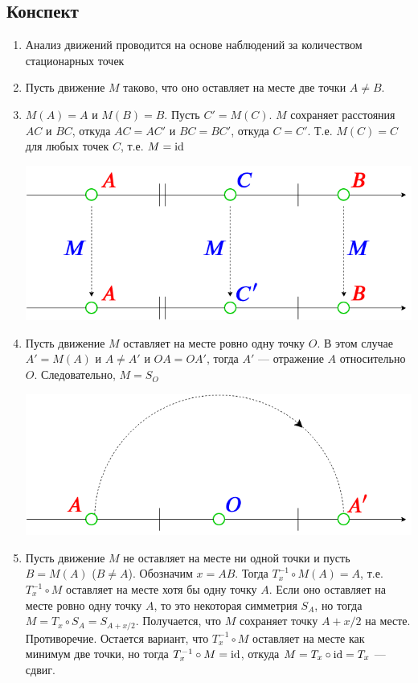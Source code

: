\subsection{Конспект}
\begin{enumerate}
\item Анализ движений проводится на основе наблюдений за количеством стационарных точек
\item Пусть движение $M$ таково, что оно оставляет на месте две точки $A\ne B$.
\item $M(A)=A$ и $M(B)=B$. Пусть $C'=M(C)$. $M$ сохраняет расстояния $AC$ и $BC$, откуда $AC=AC'$ и $BC=BC'$, откуда $C=C'$. Т.е. $M(C)=C$ для любых точек $C$, т.е. $M=\mathrm{id}$

\begin{center}
\includegraphics[scale=0.35]{LineMoving.png}
\end{center}
\item Пусть движение $M$ оставляет на месте ровно одну точку $O$. В этом случае $A'=M(A)$ и $A\ne A'$ и $OA=OA'$, тогда $A'$ --- отражение $A$ относительно $O$. Следовательно, $M=S_O$
\begin{center}
\includegraphics[scale=0.35]{LineMovingO.png}
\end{center}
\item Пусть движение $M$ не оставляет на месте ни одной точки и пусть $B=M(A)$ ($B\ne A$). Обозначим $x=AB$. Тогда $T_{x}^{-1}\circ M(A)=A$, т.е. $T_{x}^{-1}\circ M$ оставляет на месте хотя бы одну точку $A$. Если оно оставляет на месте ровно одну точку $A$, то это некоторая симметрия $S_A$, но тогда $M=T_x\circ S_A=S_{A+x/2}$. Получается, что $M$ сохраняет точку $A+x/2$ на месте. Противоречие. Остается вариант, что $T_{x}^{-1}\circ M$ оставляет на месте как минимум две точки, но тогда $T_{x}^{-1}\circ M=\mathrm{id}$, откуда $M=T_x\circ \mathrm{id}=T_x$ --- сдвиг.

\end{enumerate}
